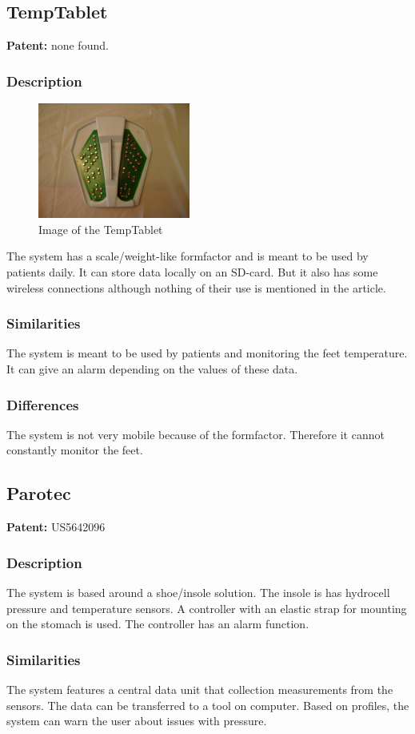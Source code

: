 \subsection{TempTablet}
\textbf{Patent:} none found.
\subsubsection{Description}
\begin{figure}
\includegraphics[width=5cm]{billeder/temptablet}
\caption{Image of the TempTablet}
\end{figure}
The system has a scale/weight-like formfactor and is meant to be used by patients daily. It can store data locally on an SD-card. But it also has some wireless connections although nothing of their use is mentioned in the article.
\subsubsection{Similarities}
The system is meant to be used by patients and monitoring the feet temperature. It can give an alarm depending on the values of these data.
\subsubsection{Differences}
The system is not very mobile because of the formfactor. Therefore it cannot constantly monitor the feet.\\


\subsection{Parotec}
\textbf{Patent:} US5642096
\subsubsection{Description}
The system is based around a shoe/insole solution. The insole is has hydrocell pressure and temperature sensors. A controller with an elastic strap for mounting on the stomach is used. The controller has an alarm function.
\subsubsection{Similarities}
The system features a central data unit that collection measurements from the sensors. The data can be transferred to a tool on computer. Based on profiles, the system can warn the user about issues with pressure. 
